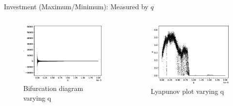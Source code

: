 \documentclass{beamer}
\begin{document}
\begin{frame}{Investment (Maximum/Minimum): Measured by $q$}
	\begin{columns}
	\begin{column}{0.5\textwidth}
		\begin{figure}
			\centering
			\includegraphics[width=1.2\textwidth]{qbifurcation.eps}
			\caption{Bifurcation diagram varying q}
		\end{figure}
	\end{column}
	\begin{column}{0.5\textwidth}
		\begin{figure}
			\centering
			\includegraphics[width=1.2\textwidth]{qlyplot.eps}
			\caption{Lyapunov plot varying q}
		\end{figure}
	\end{column}
	\end{columns}
\end{frame}
\end{document}

